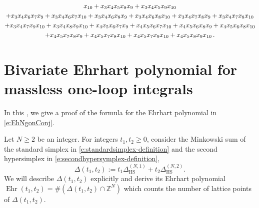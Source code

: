 \documentclass[12pt,a4paper]{article}
\theoremstyle{plain}
\theoremstyle{remark}
\newcommand{\nprops}{N}
\newcommand{\feynpar}{x}
\newcommand{\Newton}{\Delta}
\DeclareMathOperator{\ehr}{Ehr}
\newcommand{\simplexwithpars}[1]{\Newton_{\text{HS}}^{(#1)}}
\begin{document}
\begin{multline}
    \feynpar_{10}+\feynpar_{3} \feynpar_{4} \feynpar_{5} \feynpar_{8} \feynpar_{9}+\feynpar_{3} \feynpar_{4} \feynpar_{5} \feynpar_{9}
    \feynpar_{10}\cr
    +\feynpar_{3} \feynpar_{4} \feynpar_{6} \feynpar_{7} \feynpar_{9}+\feynpar_{3} \feynpar_{4} \feynpar_{6} \feynpar_{7}
    \feynpar_{10}+\feynpar_{3} \feynpar_{4} \feynpar_{6} \feynpar_{8} \feynpar_{9}+\feynpar_{3} \feynpar_{4} \feynpar_{6} \feynpar_{8}
    \feynpar_{10}+\feynpar_{3} \feynpar_{4} \feynpar_{7} \feynpar_{8} \feynpar_{9}+\feynpar_{3} \feynpar_{4} \feynpar_{7} \feynpar_{8}
    \feynpar_{10}\cr
    +\feynpar_{3} \feynpar_{4} \feynpar_{7} \feynpar_{9} \feynpar_{10}+\feynpar_{3} \feynpar_{4} \feynpar_{8} \feynpar_{9}
    \feynpar_{10}+\feynpar_{4} \feynpar_{5} \feynpar_{6} \feynpar_{7} \feynpar_{9}+\feynpar_{4} \feynpar_{5} \feynpar_{6} \feynpar_{7}
    \feynpar_{10}+\feynpar_{4} \feynpar_{5} \feynpar_{6} \feynpar_{8} \feynpar_{9}+\feynpar_{4} \feynpar_{5} \feynpar_{6} \feynpar_{8}
    \feynpar_{10}\cr
    +\feynpar_{4} \feynpar_{5} \feynpar_{7} \feynpar_{8} \feynpar_{9}+\feynpar_{4} \feynpar_{5} \feynpar_{7} \feynpar_{8} \feynpar_{10}+\feynpar_{4} \feynpar_{5} \feynpar_{7} \feynpar_{9} \feynpar_{10}+\feynpar_{4} \feynpar_{5} \feynpar_{8} \feynpar_{9} \feynpar_{10}    \,.
  \end{multline}
   
  \section{Bivariate Ehrhart polynomial for massless one-loop integrals}\label{app:oneLoopEhrhart}
  
  In this , we give a proof of the formula for the Ehrhart
  polynomial in \cref{e:EhNgonConj}.
  
  Let \( \nprops \ge 2 \) be an integer. 
For integers \( t_1,t_2 \ge 0 \), consider the Minkowski sum of the standard simplex in \cref{e:standardsimplex-definition} and the second hypersimplex in  \cref{e:secondhypersymplex-definition},
\begin{equation}
\Newton(t_1,t_2) := t_1    \simplexwithpars{\nprops,1} + t_2  \simplexwithpars{\nprops,2}  .
\end{equation}
We will describe \( \Newton(t_1,t_2) \) explicitly and derive its Ehrhart polynomial
\( \ehr(t_1,t_2) = \#(\Newton(t_1,t_2)\cap\mathbb{Z}^\nprops) \) which counts the number of lattice points of $\Newton(t_1,t_2)$.
\end{document}
